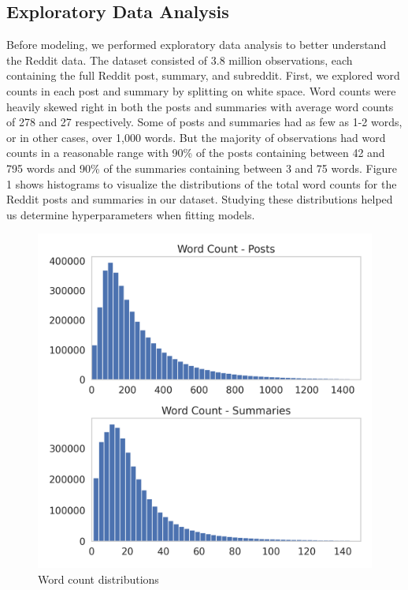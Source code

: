 \documentclass[11pt,a4paper, twocolumn]{article}
\begin{document}
\subsection{Exploratory Data Analysis}

Before modeling, we performed exploratory data analysis to better understand the Reddit data. 
The dataset consisted of 3.8 million observations, each containing the full Reddit post, summary, and subreddit. 
First, we explored word counts in each post and summary by splitting on white space. 
Word counts were heavily skewed right in both the posts and summaries with average word counts of 278 and 27 respectively. 
Some of posts and summaries had as few as 1-2 words, or in other cases, over 1,000 words. 
But the majority of observations had word counts in a reasonable range with 90\% of the posts containing between 42 and 795 words
and 90\% of the summaries containing between 3 and 75 words. 
Figure 1 shows histograms to visualize the distributions of the total word counts for the Reddit posts and summaries in our dataset. 
Studying these distributions helped us determine hyperparameters when fitting models.

\begin{figure}[h]
  \includegraphics[width=.95\linewidth]{word_counts.png}
  \caption{Word count distributions}
  \label{fig:word_counts}
\end{figure}
\end{document}
